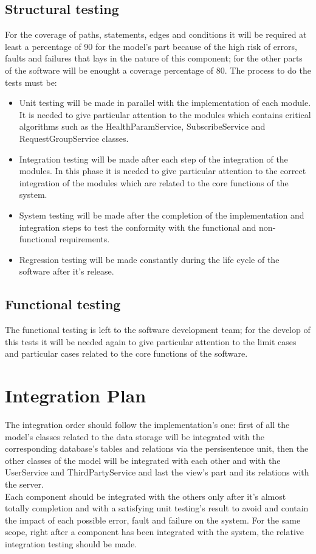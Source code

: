 \subsection{Structural testing}
For the coverage of paths, statements, edges and conditions it will be required at least a percentage of 90 for the model's part because of the high risk of errors, faults and failures that lays 	in the nature of this component; for the other parts of the software will be enought a coverage percentage of 80. The process to do the tests must be: 
	\begin{itemize}
		\item Unit testing will be made in parallel with the implementation of each module. It is needed to give particular 					attention to the modules which contains critical algorithms such as the HealthParamService, SubscribeService and 				RequestGroupService classes.
		\item Integration testing will be made after each step of the integration of the modules. In this phase it is needed to 				give particular attention to the correct integration of the modules which are related to the core functions of the system.
		\item System testing will be made after the completion of the implementation and integration steps to test the 					conformity with the functional and non-functional requirements.
		\item Regression testing will be made constantly during the life cycle of the software after it's release. 
	\end{itemize}
\subsection{Functional testing}
	The functional testing is left to the software development team; for the develop of this tests it will be needed again to give particular attention to the limit cases and particular cases 		related to the core functions of the software.
\section{Integration Plan}
The integration order should follow the implementation's one: first of all the model's classes related to the data storage will be integrated with the corresponding database's tables and relations via the persisentence unit, then  the other classes of the model will be integrated with each other and with the UserService and ThirdPartyService and last the view's part and its relations with the server.\\ 
Each component should be integrated with the others only after it's almost totally completion and with a satisfying unit testing's result to avoid and contain the impact of each possible error, fault and failure on the system. For the same scope, right after a component has been integrated with the system, the relative integration testing should be made. 





